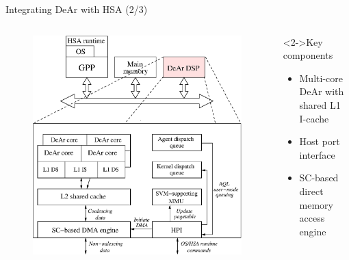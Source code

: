 \documentclass{beamer}
\begin{document}
\begin{CJK}{UTF8}{bkai}
            \begin{frame}{Integrating DeAr with HSA (2/3)}
                \begin{columns}
                    \begin{column}{0.6\textwidth}
                        \vspace{-1em}
                        \begin{figure}[!ht] 
                            \centering
                            \includegraphics[width=1.0\textwidth]{./figs/archi.eps}
                            \label{fig:archi}
                        \end{figure}
                    \end{column}
                    \begin{column}{0.40\textwidth}
                        \begin{block}<2->{Key components}
                            \begin{itemize}
                                \item <3->{Multi-core DeAr with shared L1 I-cache}
                                \item <4->{Host port interface}
                                \item <5->{SC-based direct memory access engine}
                            \end{itemize}
                        \end{block}
                    \end{column}
                \end{columns}
            \end{frame}


\end{CJK}
\end{document}
